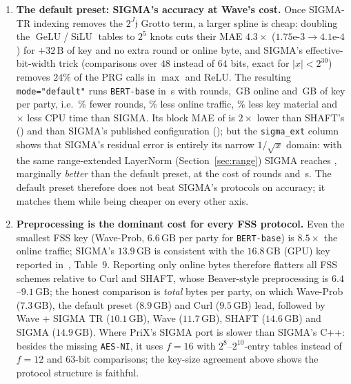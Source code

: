 \documentclass[11pt]{article}
\begin{document}
\begin{enumerate}
    \item \textbf{The default preset: SIGMA's accuracy at Wave's cost.} Once SIGMA-TR indexing removes the $2^J\mathfrak{j}$ Grotto term, a larger spline is cheap: doubling the $\operatorname{GeLU}$/$\operatorname{SiLU}$ tables to $2^5$ knots cuts their MAE $4.3\times$ ($1.75\text{e-}3 \to 4.1\text{e-}4$) for $+32\,\text{B}$ of key and no extra round or online byte, and SIGMA's effective-bit-width trick (comparisons over $48$ instead of $64$ bits, exact for $|x| < 2^{30}$) removes $24\%$ of the PRG calls in $\max$ and ReLU. The resulting \texttt{mode="default"} runs \texttt{BERT-base} in \BertBaseDefaultTimeS\,s with \BertBaseDefaultRounds{} rounds, \BertBaseDefaultOnlineGB\,GB online and \BertBaseDefaultKeyGB\,GB of key per party, i.e.\ \DefaultVsSigmaRoundsPct\% fewer rounds, \DefaultVsSigmaOnlinePct\% less online traffic, \DefaultVsSigmaKeyPct\% less key material and \DefaultVsSigmaTimeX$\times$ less CPU time than SIGMA. Its block MAE of \BertBaseDefaultMAE{} is $2\times$ lower than SHAFT's (\BertBaseShaftMAE) and than SIGMA's published configuration (\BertBaseSigmaMAE); but the \texttt{sigma\_ext} column shows that SIGMA's residual error is entirely its narrow $1/\sqrt{x}$ domain: with the same range-extended LayerNorm (Section~\ref{sec:range}) SIGMA reaches \BertBaseSigmaExtMAE, marginally \emph{better} than the default preset, at the cost of \BertBaseSigmaExtRounds{} rounds and \BertBaseSigmaExtTimeS\,s. The default preset therefore does not beat SIGMA's protocols on accuracy; it matches them while being cheaper on every other axis.
    \item \textbf{Preprocessing is the dominant cost for every FSS protocol.} Even the smallest FSS key (Wave-Prob, $6.6\,\text{GB}$ per party for \texttt{BERT-base}) is $8.5\times$ the online traffic; SIGMA's $13.9\,\text{GB}$ is consistent with the $16.8\,\text{GB}$ (GPU) key reported in~\cite{gupta2024sigma}, Table~9. Reporting only online bytes therefore flatters all FSS schemes relative to Curl and SHAFT, whose Beaver-style preprocessing is $6.4$--$9.1\,\text{GB}$; the honest comparison is \emph{total} bytes per party, on which Wave-Prob ($7.3\,\text{GB}$), the default preset ($8.9\,\text{GB}$) and Curl ($9.5\,\text{GB}$) lead, followed by Wave + SIGMA TR ($10.1\,\text{GB}$), Wave ($11.7\,\text{GB}$), SHAFT ($14.6\,\text{GB}$) and SIGMA ($14.9\,\text{GB}$). Where PriX's SIGMA port is slower than SIGMA's C++: besides the missing \texttt{AES-NI}, it uses $f=16$ with $2^{8}$--$2^{10}$-entry tables instead of $f=12$ and 63-bit comparisons; the key-size agreement above shows the protocol structure is faithful.

\end{enumerate}
\end{document}
